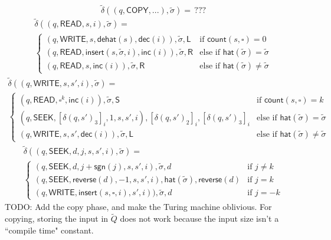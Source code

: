 \documentclass[12pt]{article}
\begin{document}
$$
\tilde{\delta}((q, \textsf{COPY}, ...), \tilde{\sigma}) = \,???
$$
\begin{multline*}
\tilde{\delta}((q, \textsf{READ}, s, i), \tilde{\sigma}) = \\
\begin{cases}
(q, \textsf{WRITE}, s, \textsf{dehat}(s), \textsf{dec}(i)), \tilde{\sigma}, \textsf{L} & \text{if } \textsf{count}(s, \square) = 0 \\
(q, \textsf{READ}, \textsf{insert}(s,\tilde{\sigma},i), \textsf{inc}(i)), \tilde{\sigma}, \textsf{R} & \text{else if } \textsf{hat}(\tilde{\sigma}) = \tilde{\sigma} \\
(q, \textsf{READ}, s, \textsf{inc}(i)), \tilde{\sigma}, \textsf{R} & \text{else if } \textsf{hat}(\tilde{\sigma}) \neq \tilde{\sigma}
\end{cases}
\end{multline*}
\begin{multline*}
\tilde{\delta}((q, \textsf{WRITE}, s, s', i), \tilde{\sigma}) = \\
\begin{cases}
(q, \textsf{READ}, \square^k, \textsf{inc}(i)), \tilde{\sigma}, \textsf{S} & \text{if } \textsf{count}(s, \square) = k \\
(q, \textsf{SEEK}, [\delta(q, s')_3]_i, 1, s, s', i), [\delta(q, s')_2]_i, [\delta(q, s')_3]_i & \text{else if } \textsf{hat}(\tilde{\sigma}) = \tilde{\sigma} \\
(q, \textsf{WRITE}, s, s', \textsf{dec}(i)), \tilde{\sigma}, \textsf{L} & \text{else if } \textsf{hat}(\tilde{\sigma}) \neq \tilde{\sigma}
\end{cases}
\end{multline*}
\begin{multline*}
\tilde{\delta}((q, \textsf{SEEK}, d, j, s, s', i), \tilde{\sigma}) = \\
\begin{cases}
(q, \textsf{SEEK}, d, j+\textsf{sgn}(j), s, s', i), \tilde{\sigma}, d & \text{if } j \neq k \\
(q, \textsf{SEEK}, \textsf{reverse}(d), -1, s, s', i), \textsf{hat}(\tilde{\sigma}), \textsf{reverse}(d) & \text{if } j = k \\
(q, \textsf{WRITE}, \textsf{insert}(s, \square, i), s', i)), \tilde{\sigma}, d & \text{if } j = -k
\end{cases}
\end{multline*}
TODO: Add the copy phase, and make the Turing machine oblivious. For copying, storing the input in $\tilde{Q}$ does not work because the input size isn't a ``compile time" constant.
\end{document}
